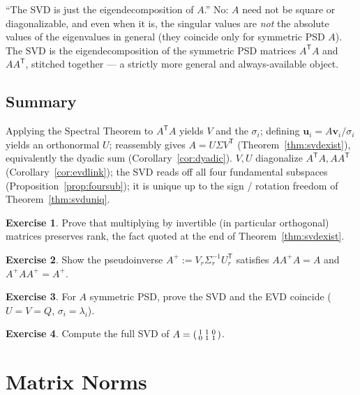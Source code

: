 \documentclass[11pt,oneside]{book}
\theoremstyle{plain}
\theoremstyle{definition}
\newtheorem{exercise}{Exercise}[chapter]
\theoremstyle{remark}
\newcommand{\T}{^{\mathsf T}}
\newcommand{\inv}{^{-1}}
\newcommand{\bu}{\mathbf{u}}
\newcommand{\bv}{\mathbf{v}}
\begin{document}
\begin{miscon_box}
``The SVD is just the eigendecomposition of $A$.'' No: $A$ need not be square or
diagonalizable, and even when it is, the singular values are \emph{not} the absolute
values of the eigenvalues in general (they coincide only for symmetric PSD $A$). The SVD
is the eigendecomposition of the symmetric PSD matrices $A\T A$ and $AA\T$, stitched
together --- a strictly more general and always-available object.
\end{miscon_box}

\section*{Summary}
Applying the Spectral Theorem to $A\T A$ yields $V$ and the $\sigma_i$; defining
$\bu_i=A\bv_i/\sigma_i$ yields an orthonormal $U$; reassembly gives $A=U\Sigma V\T$
(Theorem~\ref{thm:svdexist}), equivalently the dyadic sum (Corollary~\ref{cor:dyadic}).
$V,U$ diagonalize $A\T A,AA\T$ (Corollary~\ref{cor:evdlink}); the SVD reads off all four
fundamental subspaces (Proposition~\ref{prop:foursub}); it is unique up to the sign /
rotation freedom of Theorem~\ref{thm:svduniq}.

\begin{exercise}
Prove that multiplying by invertible (in particular orthogonal) matrices preserves rank,
the fact quoted at the end of Theorem~\ref{thm:svdexist}.
\end{exercise}
\begin{exercise}
Show the pseudoinverse $A^+:=V_r\Sigma_r\inv U_r\T$ satisfies $AA^+A=A$ and $A^+AA^+=A^+$.
\end{exercise}
\begin{exercise}
For $A$ symmetric PSD, prove the SVD and the EVD coincide ($U=V=Q$, $\sigma_i=\lambda_i$).
\end{exercise}
\begin{exercise}
Compute the full SVD of $A=\begin{psmallmatrix}1&1&0\\0&1&1\end{psmallmatrix}$.
\end{exercise}

\chapter{Matrix Norms}\label{ch:norms}
\end{document}
